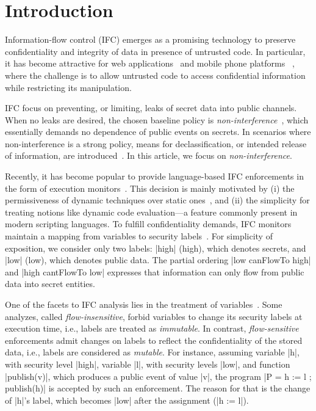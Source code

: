\section{Introduction}
\label{sec:intro}

Information-flow control (IFC) emerges as a promising technology to preserve
confidentiality and integrity of data in presence of untrusted code.  In
particular, it has become attractive for web 
applications~\citep[e.g.][]{DeGroef:2012:FWB:2382196.2382275, giffin:hails,
  yang:2013:towards, conf/esorics/AkhaweLHSS13, Hedin13} and mobile phone
platforms ~\citep[e.g.][]{Enck:2010,android:esorics13}, where the challenge is
to allow untrusted code to access confidential information while restricting its
manipulation.

IFC focus on preventing, or limiting, leaks of secret data into public
channels. When no leaks are desired, the chosen baseline policy is
\emph{non-interference}~\citep{Goguen:Meseguer:Noninterference}, which 
essentially demands no dependence of public events on secrets. In scenarios where
non-interference is a strong policy, means for declassification, or intended
release of information, are introduced~\citep{Sabelfeld:Sands:CSFW05}. In this
article, we focus on \emph{non-interference}. 

Recently, it has become popular to provide language-based IFC enforcements in
the form of execution monitors~\citep{Hedin2011}. This decision is mainly
motivated by (i) the permissiveness of dynamic techniques over static
ones~\citep{Sabelfeld:Russo:PSI09}, and (ii) the simplicity for treating notions
like dynamic code evaluation---a feature commonly present in modern scripting
languages. To fulfill confidentiality demands, IFC monitors maintain a
mapping from variables to security labels~\citep{myers:dlm,Stefan:2011}.  
For simplicity of exposition, we consider only two labels: |high| (high), which
denotes secrets, and |low| (low), which denotes public data. The partial ordering
|low canFlowTo high| and |high cantFlowTo low| expresses that information
can only flow from public data into secret entities.

One of the facets to IFC analysis lies in the treatment of
variables~\citep{Hunt:2006}. Some analyzes, called \emph{flow-insensitive},
forbid variables to change its security labels at execution time, i.e., labels
are treated as \emph{immutable}. In contrast, \emph{flow-sensitive} enforcements
admit changes on labels to reflect the confidentiality of the stored data, i.e.,
labels are considered as \emph{mutable}. For instance, assuming variable |h|,
with security level |high|, variable |l|, with security levels |low|, and
function |publish(v)|, which produces a public event of value |v|, the program
|P = h := l ; publish(h)| is accepted by such an enforcement. The reason for
that is the change of |h|'s label, which becomes |low| after
the assignment (|h := l|).

